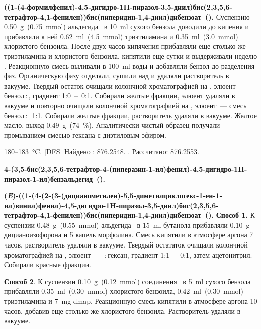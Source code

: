 \textbf{((1-(4-формилфенил)-4,5-дигидро-1H-пиразол-3,5-диил)бис(2,3,5,6-тетрафтор-4,1-фенилен))бис(пиперидин-1,4-диил)дибензоат~().} Суспензию \SI{0.50}{\gram}~(\SI{0.75}{\mmol}) альдегида~\textbf{} в \SI{10}{\milli\litre} сухого бензола доводили до кипения и прибавляли к ней \SI{0.62}{\milli\litre}~(\SI{4.5}{\mmol}) триэтиламина и \SI{0.35}{\milli\litre}~(\SI{3.0}{\mmol}) хлористого бензоила. После двух часов кипячения прибавляли еще столько же триэтиламина и хлористого бензоила, кипятили еще сутки и выдерживали неделю . Реакционную смесь выливали в \SI{100}{\milli\litre} воды и добавляли бензол до разделения фаз. Органическую фазу отделяли, сушили над  и удаляли растворитель в вакууме. Твердый остаток очищали колончной хроматографией на , элюент~--- бензол\,:\,, градиент 1:0~--~0:1. Собирали желтые фракции, элюент удаляли в вакууме и повторно очищали колончной хроматографией на , элюент~--- смесь бензол\,:\,~1:1. Собирали желтые фракции, растворитель удаляли в вакууме. Желтое масло, выход \SI{0.49}{\gram}~(\SI{74}{\percent}). Аналитически чистый образец получали промыванием смесью гексана с диэтиловым эфиром.
\begin{experimental}[format=\bfseries]
     180--\SI{183}{\celsius}.
    [DFS] Найдено \ce{[M+]}: \num{876.2548}. . Рассчитано:  \num{876.2553}.
\end{experimental}

\textbf{4-(3,5-бис(2,3,5,6-тетрафтор-4-(пиперазин-1-ил)фенил)-4,5-дигидро-1H-пиразол-1-ил)бензальдегид~().}

\textbf{(\textit{E})-((1-(4-(2-(3-(дицианометилен)-5,5-диметилциклогекс-1-ен-1-ил)винил)фенил)-4,5-дигидро-1H-пиразол-3,5-диил)бис(2,3,5,6-тетрафтор-4,1-фенилен))бис(пиперидин-1,4-диил)дибензоат~().} \textbf{Способ 1.} К суспензии \SI{0.48}{\gram}~(\SI{0.55}{\mmol}) альдегида~\textbf{} в \SI{15}{\milli\litre} бутанола прибавляли \SI{0.10}{\gram} дицианоизофорона \textbf{} и 5 капель морфолина. Смесь кипятили в атмосфере аргона 7 часов, растворитель удаляли в вакууме. Твердый остататок очищали колончной хроматографией на , элюент~--- \,:\,гексан, градиент 1:1~--~0:1, затем ацетонитрил. Собирали красные фракции.

\textbf{Способ 2}.  К суспензии \SI{0.10}{\gram}~(\SI{0.12}{\mmol}) соединения~\textbf{} в \SI{5}{\milli\litre} сухого бензола прибавляли \SI{0.35}{\milli\litre}~(\SI{0.30}{\mmol}) хлористого бензоила, \SI{0.42}{\milli\litre}~(\SI{0.30}{\mmol}) триэтиламина и \SI{7}{\milli\gram} \ac{dmap}. Реакционную смесь кипятили в атмосфере аргона 10 часов, добавив еще столько же хлористого бензоила. Растворитель удаляли в вакууме.

